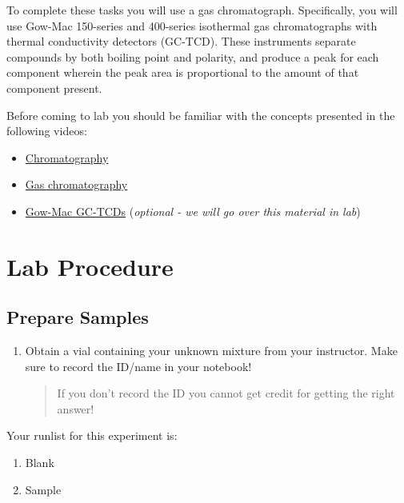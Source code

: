 \documentclass[]{tufte-book}
\providecommand{\tightlist}{%
  \setlength{\itemsep}{0pt}\setlength{\parskip}{0pt}}
\begin{document}
To complete these tasks you will use a gas chromatograph. Specifically, you will use Gow-Mac 150-series and 400-series isothermal gas chromatographs with thermal conductivity detectors (GC-TCD). These instruments separate compounds by both boiling point and polarity, and produce a peak for each component wherein the peak area is proportional to the amount of that component present.

Before coming to lab you should be familiar with the concepts presented in the following videos:

\begin{itemize}
\tightlist
\item
  \href{https://www.youtube.com/watch?v=SnbXQTTHGs4}{Chromatography}
\item
  \href{https://www.youtube.com/watch?v=4Xaa9WdXVTM}{Gas chromatography}\\
\item
  \href{https://youtu.be/0fxH9WRKigw}{Gow-Mac GC-TCDs} (\emph{optional - we will go over this material in lab})
\end{itemize}

\hypertarget{lab-procedure}{%
\section{Lab Procedure}\label{lab-procedure}}

\hypertarget{prepare-samples}{%
\subsection{Prepare Samples}\label{prepare-samples}}

\begin{enumerate}
\def\labelenumi{\arabic{enumi}.}
\item
  Obtain a vial containing your unknown mixture from your instructor. Make sure to record the ID/name in your notebook!

  \begin{quote}
  If you don't record the ID you cannot get credit for getting the right answer!
  \end{quote}
\end{enumerate}

Your runlist for this experiment is:

\begin{enumerate}
\def\labelenumi{\arabic{enumi}.}
\tightlist
\item
  Blank
\item
  Sample
\end{enumerate}
\end{document}
